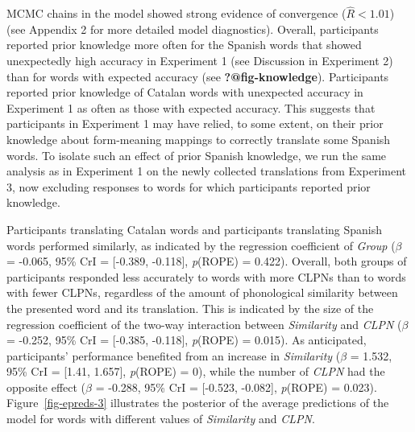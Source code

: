 \documentclass[
]{article}
\begin{document}
MCMC chains in the model showed strong evidence of convergence
(\(\hat{R}<1.01\)) (see Appendix 2 for more detailed model diagnostics).
Overall, participants reported prior knowledge more often for the
Spanish words that showed unexpectedly high accuracy in Experiment 1
(see Discussion in Experiment 2) than for words with expected accuracy
(see \textbf{?@fig-knowledge}). Participants reported prior knowledge of
Catalan words with unexpected accuracy in Experiment 1 as often as those
with expected accuracy. This suggests that participants in Experiment 1
may have relied, to some extent, on their prior knowledge about
form-meaning mappings to correctly translate some Spanish words. To
isolate such an effect of prior Spanish knowledge, we run the same
analysis as in Experiment 1 on the newly collected translations from
Experiment 3, now excluding responses to words for which participants
reported prior knowledge.

Participants translating Catalan words and participants translating
Spanish words performed similarly, as indicated by the regression
coefficient of \emph{Group} (\(\beta\) = -0.065, 95\% CrI = {[}-0.389,
-0.118{]}, \emph{p}(ROPE) = 0.422). Overall, both groups of participants
responded less accurately to words with more CLPNs than to words with
fewer CLPNs, regardless of the amount of phonological similarity between
the presented word and its translation. This is indicated by the size of
the regression coefficient of the two-way interaction between
\emph{Similarity} and \emph{CLPN} (\(\beta\) = -0.252, 95\% CrI =
{[}-0.385, -0.118{]}, \emph{p}(ROPE) = 0.015). As anticipated,
participants' performance benefited from an increase in
\emph{Similarity} (\(\beta\) = 1.532, 95\% CrI = {[}1.41, 1.657{]},
\emph{p}(ROPE) = 0), while the number of \emph{CLPN} had the opposite
effect (\(\beta\) = -0.288, 95\% CrI = {[}-0.523, -0.082{]},
\emph{p}(ROPE) = 0.023). Figure~\ref{fig-epreds-3} illustrates the
posterior of the average predictions of the model for words with
different values of \emph{Similarity} and \emph{CLPN}.
\end{document}
